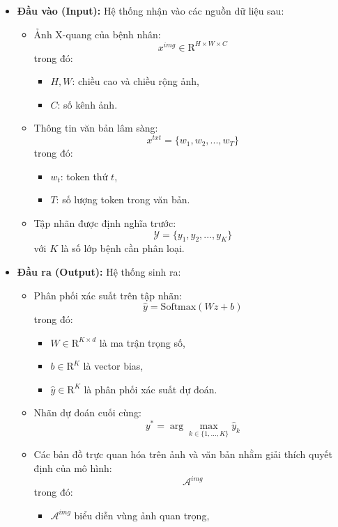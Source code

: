 \begin{itemize}
  \item \textbf{Đầu vào (Input):} Hệ thống nhận vào các nguồn dữ liệu sau:

  \begin{itemize}
    \item Ảnh X-quang của bệnh nhân:
    \[
        x^{img} \in \mathrm{R}^{H \times W \times C}
    \]
    trong đó:
    \begin{itemize}
        \item $H, W$: chiều cao và chiều rộng ảnh,
        \item $C$: số kênh ảnh.
    \end{itemize}

    \item Thông tin văn bản lâm sàng:
    \[
        x^{txt} = \{w_1, w_2, ..., w_T\}
    \]
    trong đó:
    \begin{itemize}
        \item $w_t$: token thứ $t$,
        \item $T$: số lượng token trong văn bản.
    \end{itemize}

    \item Tập nhãn được định nghĩa trước:
    \[
        \mathcal{Y} = \{y_1, y_2, ..., y_K\}
    \]
    với $K$ là số lớp bệnh cần phân loại.
  \end{itemize}

  \pagebreak

  \item \textbf{Đầu ra (Output):} Hệ thống sinh ra:

  \begin{itemize}
    \item Phân phối xác suất trên tập nhãn:
    \[
        \hat{y} = \text{Softmax}(Wz + b)
    \]
    trong đó:
    \begin{itemize}
        \item $W \in \mathrm{R}^{K \times d}$ là ma trận trọng số,
        \item $b \in \mathrm{R}^{K}$ là vector bias,
        \item $\hat{y} \in \mathrm{R}^{K}$ là phân phối xác suất dự đoán.
    \end{itemize}

    \item Nhãn dự đoán cuối cùng:
    \[
        y^{*} = \arg\max_{k \in \{1,...,K\}} \hat{y}_k
    \]

    \item Các bản đồ trực quan hóa trên ảnh và văn bản nhằm giải thích quyết định của mô hình:
    \[
        \mathcal{A}^{img}
    \]
    trong đó:
    \begin{itemize}
        \item $\mathcal{A}^{img}$ biểu diễn vùng ảnh quan trọng,
    \end{itemize}
  \end{itemize}
\end{itemize}

